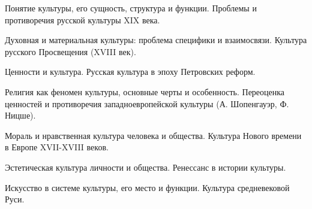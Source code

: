 \documentclass[
	14pt,
	a4paper,
	]
	{scrartcl}
\begin{document}
\shapk
{}
\setcounter{zad}{0}

\vfill
\z Понятие культуры, его сущность, структура и функции.
 \vfill
\z Проблемы и противоречия русской культуры XIX века.
 \vfill

\vfill

\newpage


\shapk
{}
\setcounter{zad}{0}

\vfill
\z Духовная и материальная культуры: проблема специфики и взаимосвязи.
 \vfill
\z Культура русского Просвещения (XVIII век).
 \vfill

\vfill

\newpage


\shapk
{}
\setcounter{zad}{0}

\vfill
\z Ценности и культура.
 \vfill
\z Русская культура в эпоху Петровских реформ.
 \vfill

\vfill

\newpage


\shapk
{}
\setcounter{zad}{0}

\vfill
\z Религия как феномен культуры, основные черты и особенность.
 \vfill
\z Переоценка ценностей и противоречия западноевропейской культуры (А. Шопенгауэр, Ф. Ницше).
 \vfill

\vfill

\newpage


\shapk
{}
\setcounter{zad}{0}

\vfill
\z Мораль и нравственная культура человека и общества.
 \vfill
\z Культура Нового времени в Европе XVII-XVIII веков.
 \vfill

\vfill

\newpage


\shapk
{}
\setcounter{zad}{0}

\vfill
\z Эстетическая культура личности и общества.
 \vfill
\z Ренессанс в истории культуры.
 \vfill

\vfill

\newpage


\shapk
{}
\setcounter{zad}{0}

\vfill
\z Искусство в системе культуры, его место и функции.
 \vfill
\z Культура средневековой Руси.
 \vfill

\vfill

\newpage


\shapk
{}
\setcounter{zad}{0}
\end{document}
